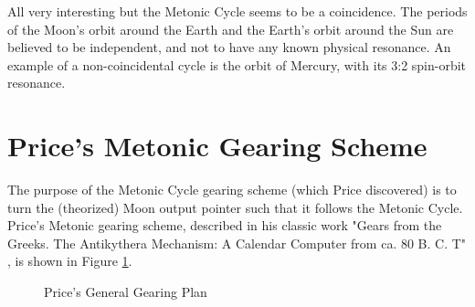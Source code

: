 \documentclass[11pt, oneside]{article}   	%
\theoremstyle{definition}
\begin{document}
\medskip
\bigskip
\noindent
All very interesting but the Metonic Cycle seems to be a coincidence. The periods of the Moon's orbit around the Earth and the Earth's 
orbit around the Sun are believed to be independent, and not to have any known physical resonance. An example of a non-coincidental 
cycle is the orbit of Mercury, with its 3:2 spin-orbit resonance.

\section{Price's Metonic Gearing Scheme}
The purpose of the Metonic Cycle gearing scheme (which Price discovered) is to turn the (theorized) Moon output pointer such that it follows the Metonic Cycle.
Price's Metonic gearing scheme, described in his classic work "Gears from the Greeks. The Antikythera Mechanism: A Calendar Computer from ca. 80 B. C. T" \cite{gears_from_the_greeks}, 
is shown in Figure \ref{fig:general_gearing_plan}. 

\bigskip
\begin{figure}[H]
\caption{Price's General Gearing Plan \cite{gears_from_the_greeks}}
\label{fig:general_gearing_plan}
\end{figure}
\end{document}
